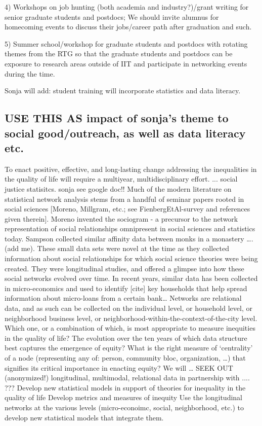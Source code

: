 \documentclass[11pt]{NSFamsart}
\begin{document}
4) Workshops on job hunting (both academia and industry?)/grant writing for senior graduate students and postdocs;  We should invite alumnus for homecoming events to discuss their jobs/career path after graduation and such.

5) Summer school/workshop for graduate students and postdocs with rotating themes from the RTG so that the graduate students and postdocs can be exposure to research areas outside of IIT and participate in networking events during the time.

{\color{magenta}Sonja will add: student training will incorporate  statistics and data literacy.} 


\subsection*{USE THIS AS impact of sonja's theme to social good/outreach, as well as data literacy etc.}
To enact positive, effective, and long-lasting change addressing the inequalities in the quality of life will require a multiyear, multidisciplinary effort.  ... social justice statisitcs. {\color{cyan}sonja see google doc!!} 
Much of the modern literature on statistical network analysis stems from a handful of seminar papers rooted in social sciences [Moreno, Millgram, etc.; see FienbergEtAl-survey and references given therein]. Moreno invented the sociogram - a precursor to the network representation of social relationships omnipresent in social sciences and statistics today. Sampson collected similar affinity data between monks in a monastery ….(add me). These small data sets were novel at the time as they collected information about social relationships for which social science theories were being created. They were longitudinal studies, and offered a glimpse into how these social networks evolved over time. In recent years, similar data has been collected in micro-economics and used to identify [cite] key households that help spread information about micro-loans from a certain bank… 
Networks are relational data, and as such can be collected on the individual level, or household level, or neighborhood business level, or neighborhood-within-the-context-of-the-city level. Which one, or a combination of which, is most appropriate to measure inequities in the quality of life? The evolution over the ten years of which data structure best captures the emergence of equity? What is the right measure of ‘centrality’ of a node (representing any of: person, community bloc, organization, …) that signifies its critical importance in enacting equity? 
We will … 
SEEK OUT (anonymized!) longitudinal, multimodal, relational data in partnership with .... ??? 
Develop new statistical models in support of theories for inequality in the quality of life 
Develop metrics and measures of inequity 
Use the longitudinal networks at the various levels (micro-econoimc, social, neighborhood, etc.) to develop new statistical models that integrate them.
\end{document}
